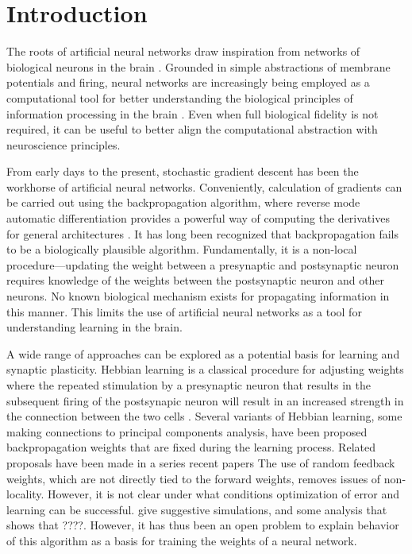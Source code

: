\section{Introduction}

The roots of artificial neural networks draw inspiration from networks of biological neurons in the brain \citep{pdp,pinker,elman,medler}. Grounded in simple abstractions of membrane potentials and firing, neural networks are increasingly being employed as a computational tool for better understanding the biological principles of information processing in the brain \citep{ilker1,ilker2,yamins1,yamins2}. Even when full biological fidelity is not required, it can be useful to better align the computational abstraction with neuroscience principles.

From early days to the present, stochastic gradient descent has been the workhorse of artificial neural networks. Conveniently, calculation of gradients can be carried out using the backpropagation algorithm, where reverse mode automatic differentiation provides a powerful way of computing the derivatives for general architectures \citep{rumelhart:86}.
It has long been recognized that backpropagation fails to be a biologically plausible algorithm. Fundamentally, it is a non-local procedure---updating the weight between a presynaptic and postsynaptic neuron requires knowledge of the weights between the postsynaptic neuron and other neurons. No known biological mechanism exists for propagating information in this manner. This limits the use of artificial neural networks as a tool for understanding learning in the brain.

A wide range of approaches can be explored as a potential basis for learning and synaptic plasticity. Hebbian learning is a classical procedure for adjusting weights where
the repeated stimulation by a presynaptic neuron that results in the subsequent
firing of the postsynapic neuron will result in an increased strength in the connection
between the two cells \citep{hebb1,paulsen}. Several variants of Hebbian learning, some making connections to principal components analysis, have been proposed
backpropagation weights that are fixed during the learning process.
Related proposals have been made in a series recent papers \citep{akrout,bellec,lillicrap2020backpropagation}
The use of random feedback weights, which are not directly tied to the forward weights, removes issues of non-locality. However, it is not clear under what conditions optimization of error and learning can be successful. \citep{lillicrap2016random} give suggestive simulations, and some analysis that shows that ????. However, it has thus been an open problem to explain behavior of this algorithm as a basis for training the weights of a neural network.

